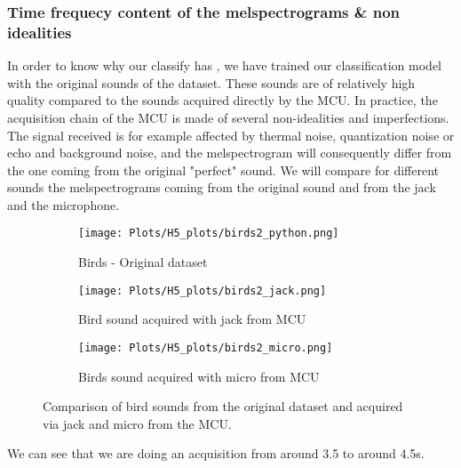 \documentclass{article}
\begin{document}
\subsubsection{Time frequecy content of the melspectrograms \& non idealities}

In order to know why our classify has , we have trained our classification model with the original sounds of the dataset. These sounds are of relatively high quality compared to the sounds acquired directly by the MCU. In practice, the acquisition chain of the MCU is made of several non-idealities and imperfections. The signal received is for example affected by thermal noise, quantization noise or echo and background noise, and the melspectrogram will consequently differ from the one coming from the original "perfect" sound. We will compare for different sounds the melspectrograms coming from the original sound and from the jack and the microphone.

\begin{figure}[H]
    \centering
    \begin{subfigure}{0.35\linewidth} %
        \centering
        \texttt{[image: Plots/H5\_plots/birds2\_python.png]}
        \caption{Birds - Original dataset}
    \end{subfigure}
    \hfill
    \begin{subfigure}{0.27\linewidth} %
        \centering
        \texttt{[image: Plots/H5\_plots/birds2\_jack.png]}
        \caption{Bird sound acquired with jack from MCU}
    \end{subfigure}
    \hfill
    \begin{subfigure}{0.27\linewidth} %
        \centering
        \texttt{[image: Plots/H5\_plots/birds2\_micro.png]}
        \caption{Birds sound acquired with micro from MCU}
    \end{subfigure}
    \caption{Comparison of bird sounds from the original dataset and  acquired via jack and micro from the MCU.}
\end{figure}

We can see that we are doing an acquisition from around 3.5 to around 4.5s.
\end{document}
